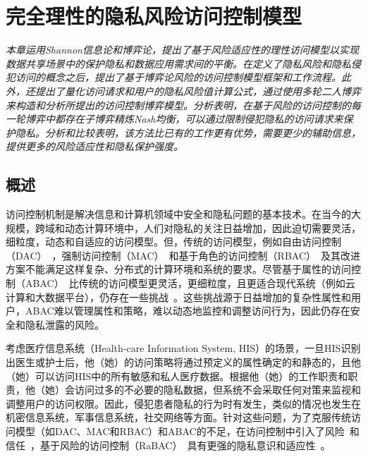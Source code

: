 \chapter{完全理性的隐私风险访问控制模型}
\label{chap:game-theoretical-RaBAC-for-privacy}

\textit{}

\textit{本章运用Shannon信息论和博弈论，提出了基于风险适应性的理性访问模型以实现数据共享场景中的保护隐私和数据应用需求间的平衡。在定义了隐私风险和隐私侵犯访问的概念之后，提出了基于博弈论风险的访问控制模型框架和工作流程。此外，还提出了量化访问请求和用户的隐私风险值计算公式，通过使用多轮二人博弈来构造和分析所提出的访问控制博弈模型。分析表明，在基于风险的访问控制的每一轮博弈中都存在子博弈精炼Nash均衡，可以通过限制侵犯隐私的访问请求来保护隐私。分析和比较表明，该方法比已有的工作更有优势，需要更少的辅助信息，提供更多的风险适应性和隐私保护强度。}

\section{概述}

访问控制机制是解决信息和计算机领域中安全和隐私问题的基本技术。在当今的大规模，跨域和动态计算环境中，人们对隐私的关注日益增加，因此迫切需要灵活，细粒度，动态和自适应的访问模型。但，传统的访问模型，例如自由访问控制（DAC）~\cite{lampson1974protection}，强制访问控制（MAC）~\cite{bell1973secure}和基于角色的访问控制（RBAC）~\cite{sandhu1996role}及其改进方案不能满足这样复杂、分布式的计算环境和系统的要求。尽管基于属性的访问控制（ABAC）~\cite{kuhn2010adding}比传统的访问模型更灵活，更细粒度，且更适合现代系统（例如云计算和大数据平台），仍存在一些挑战~\cite{servos2017current,paci2018survey}。这些挑战源于日益增加的复杂性属性和用户，ABAC难以管理属性和策略，难以动态地监控和调整访问行为，因此仍存在安全和隐私泄露的风险。

考虑医疗信息系统（Health-care Information System, HIS）的场景，一旦HIS识别出医生或护士后，他（她）的访问策略将通过预定义的属性确定的和静态的，且他（她）可以访问HIS中的所有敏感和私人医疗数据。根据他（她）的工作职责和职责，他（她）会访问过多的不必要的隐私数据，但系统不会采取任何对策来监视和调整用户的访问权限。因此，侵犯患者隐私的行为时有发生，类似的情况也发生在机密信息系统，军事信息系统，社交网络等方面。针对这些问题，为了克服传统访问模型（如DAC、MAC和RBAC）和ABAC的不足，在访问控制中引入了风险~\cite{cheng2007fuzzy, zhang2018privacy}和信任~\cite{dimmock2004using, pustchi2015mt}，基于风险的访问控制（RaBAC）~\cite{cheng2007fuzzy}具有更强的隐私意识和适应性~\cite{ni2010risk, wang2011quantified, zhang2018privacy}。


